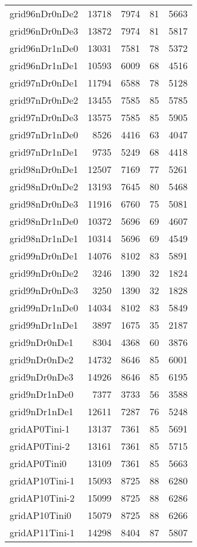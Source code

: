 \documentclass[../../../thesis.tex]{subfiles}
\begin{document}
\begin{longtable}{lrrrr}
grid96nDr0nDe2 & 13718 & 7974 & 81 & 5663 \\
grid96nDr0nDe3 & 13872 & 7974 & 81 & 5817 \\
grid96nDr1nDe0 & 13031 & 7581 & 78 & 5372 \\
grid96nDr1nDe1 & 10593 & 6009 & 68 & 4516 \\
grid97nDr0nDe1 & 11794 & 6588 & 78 & 5128 \\
grid97nDr0nDe2 & 13455 & 7585 & 85 & 5785 \\
grid97nDr0nDe3 & 13575 & 7585 & 85 & 5905 \\
grid97nDr1nDe0 & 8526 & 4416 & 63 & 4047 \\
grid97nDr1nDe1 & 9735 & 5249 & 68 & 4418 \\
grid98nDr0nDe1 & 12507 & 7169 & 77 & 5261 \\
grid98nDr0nDe2 & 13193 & 7645 & 80 & 5468 \\
grid98nDr0nDe3 & 11916 & 6760 & 75 & 5081 \\
grid98nDr1nDe0 & 10372 & 5696 & 69 & 4607 \\
grid98nDr1nDe1 & 10314 & 5696 & 69 & 4549 \\
grid99nDr0nDe1 & 14076 & 8102 & 83 & 5891 \\
grid99nDr0nDe2 & 3246 & 1390 & 32 & 1824 \\
grid99nDr0nDe3 & 3250 & 1390 & 32 & 1828 \\
grid99nDr1nDe0 & 14034 & 8102 & 83 & 5849 \\
grid99nDr1nDe1 & 3897 & 1675 & 35 & 2187 \\
grid9nDr0nDe1 & 8304 & 4368 & 60 & 3876 \\
grid9nDr0nDe2 & 14732 & 8646 & 85 & 6001 \\
grid9nDr0nDe3 & 14926 & 8646 & 85 & 6195 \\
grid9nDr1nDe0 & 7377 & 3733 & 56 & 3588 \\
grid9nDr1nDe1 & 12611 & 7287 & 76 & 5248 \\
gridAP0Tini-1 & 13137 & 7361 & 85 & 5691 \\
gridAP0Tini-2 & 13161 & 7361 & 85 & 5715 \\
gridAP0Tini0 & 13109 & 7361 & 85 & 5663 \\
gridAP10Tini-1 & 15093 & 8725 & 88 & 6280 \\
gridAP10Tini-2 & 15099 & 8725 & 88 & 6286 \\
gridAP10Tini0 & 15079 & 8725 & 88 & 6266 \\
gridAP11Tini-1 & 14298 & 8404 & 87 & 5807 \\

\end{longtable}
\end{document}
